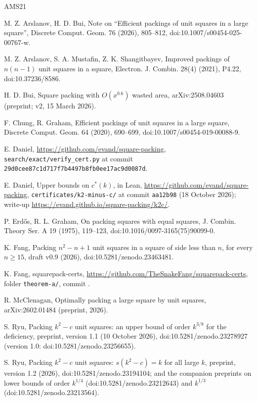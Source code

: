 \documentclass[11pt,letterpaper]{amsart}
\theoremstyle{plain}
\theoremstyle{remark}
\newcommand{\cs}{c^{*}}
\begin{document}
\begin{thebibliography}{AMS21}

 M. Z. Arslanov, H. D. Bui, Note on ``Efficient packings of unit squares in a large square'', Discrete Comput. Geom. 76 (2026), 805--812, doi:10.1007/s00454-025-00767-w.

 M. Z. Arslanov, S. A. Mustafin, Z. K. Shangitbayev, Improved packings of $n(n-1)$ unit squares in a square, Electron. J. Combin. 28(4) (2021), P4.22, doi:10.37236/8586.

 H. D. Bui, Square packing with $O(x^{0.6})$ wasted area, arXiv:2508.04603 (preprint; v2, 15 March 2026).

 F. Chung, R. Graham, Efficient packings of unit squares in a large square, Discrete Comput. Geom. 64 (2020), 690--699, doi:10.1007/s00454-019-00088-9.

 E. Daniel, \url{https://github.com/evand/square-packing}, \texttt{search/exact/verify\_cert.py} at commit \texttt{29d0cee87c1d717f7b4497b8fb0ee17ac9d0087d}.

 E. Daniel, Upper bounds on $\cs(k)$, in Lean, \url{https://github.com/evand/square-packing}, \texttt{certificates/k2-minus-c/} at commit \texttt{aa12b98} (18 October 2026); write-up \url{https://evand.github.io/square-packing/k2c/}.

 P. Erd\H{o}s, R. L. Graham, On packing squares with equal squares, J. Combin. Theory Ser. A 19 (1975), 119--123, doi:10.1016/0097-3165(75)90099-0.

 K. Fang, Packing $n^2-n+1$ unit squares in a square of side less than $n$, for every $n\ge15$, draft v0.9 (2026), doi:10.5281/zenodo.23463481.

 K. Fang, squarepack-certs, \url{https://github.com/TheSnakeFang/squarepack-certs}, folder \texttt{theorem-a/}, commit .

 R. McClenagan, Optimally packing a large square by unit squares, arXiv:2602.01484 (preprint, 2026).

 S. Ryu, Packing $k^2-c$ unit squares: an upper bound of order $k^{3/8}$ for the deficiency, preprint, version 1.1 (10 October 2026), doi:10.5281/zenodo.23278927 (version 1.0: doi:10.5281/zenodo.23256655).

 S. Ryu, Packing $k^2-c$ unit squares: $s(k^2-c)=k$ for all large $k$, preprint, version 1.2 (2026), doi:10.5281/zenodo.23194104; and the companion preprints on lower bounds of order $k^{1/4}$ (doi:10.5281/zenodo.23212643) and $k^{1/3}$ (doi:10.5281/zenodo.23213564).

\end{thebibliography}
\end{document}
